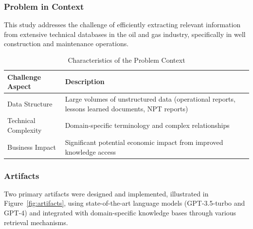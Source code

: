         \subsubsection{Problem in Context}
        
        This study addresses the challenge of efficiently extracting relevant information from extensive technical databases in the oil and gas industry, specifically in well construction and maintenance operations. 
        
        \begin{table}[h]
            \centering
            \caption{Characteristics of the Problem Context}
            \begin{tabular}{|p{}|p{}|}
            \hline
            \textbf{Challenge Aspect} & \textbf{Description} \\
            \hline
            Data Structure & Large volumes of unstructured data (operational reports, lessons learned documents, NPT reports) \\
            \hline
            Technical Complexity & Domain-specific terminology and complex relationships \\
            \hline
            Business Impact & Significant potential economic impact from improved knowledge access \\
            \hline
            \end{tabular}
            \label{tab:problem-context}
        \end{table}
        
        \subsubsection{Artifacts}
        
        Two primary artifacts were designed and implemented, illustrated in Figure~\ref{fig:artifacts}, using state-of-the-art language models (GPT-3.5-turbo and GPT-4) and integrated with domain-specific knowledge bases through various retrieval mechanisms.
        
